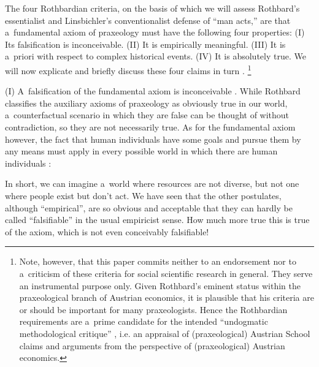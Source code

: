 The four Rothbardian criteria, on the basis of which we will assess Rothbard's essentialist and Linsbichler's conventionalist defense of ``man acts,'' are that a~fundamental axiom of praxeology must have the following four properties: (I) Its falsification is inconceivable. (II) It is empirically meaningful. (III) It is a~priori with respect to complex historical events. (IV) It is absolutely true. We will now explicate and briefly discuss these four claims in turn 
\parencites[][pp.314]{}[][p.25]{rothbard_praxeology:_1976}.%
\footnote{Note, however, that this paper commits neither to an endorsement nor to a~criticism of these criteria for social scientific research in general. They serve an instrumental purpose only. Given Rothbard's eminent status within the praxeological branch of Austrian economics, it is plausible that his criteria are or should be important for many praxeologists. Hence the Rothbardian requirements are a~prime candidate for the intended ``undogmatic methodological critique'' 
\parencite[][p.129]{caldwell_praxeology_1984}, %
 i.e. an appraisal of (praxeological) Austrian School claims and arguments from the perspective of (praxeological) Austrian economics.}



(I) A~falsification of the fundamental axiom is inconceivable 
\parencite[][p.318]{rothbard_defense_1957}. %
 While Rothbard classifies the auxiliary axioms of praxeology as obviously true in our world, a~counterfactual scenario in which they are false can be thought of without contradiction, so they are not necessarily true. As for the fundamental axiom however, the fact that human individuals have some goals and pursue them by any means must apply in every possible world in which there are human individuals 
\parencite[][pp.314–315]{rothbard_defense_1957}:%




In short, we can imagine a~world where resources are not diverse, but not one where people exist but don't act. We have seen that the other postulates, although ``empirical'', are so obvious and acceptable that they can hardly be called ``falsifiable'' in the usual empiricist sense. How much more true this is true of the axiom, which is not even conceivably falsifiable! 
\parencite[][p.317]{rothbard_defense_1957}%





